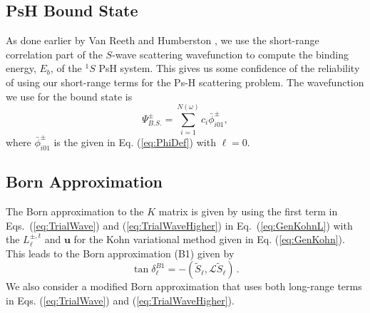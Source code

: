 \documentclass[preprint,showpacs,showkeys,preprintnumbers,amsmath,amssymb,longbibliography,pra,aps]{revtex4-1}
\begin{document}
\subsection{PsH Bound State}
As done earlier by Van Reeth and Humberston \cite{VanReeth2003,VanReeth2004},
we use the short-range correlation part of the $S$-wave scattering wavefunction
to compute the binding energy, $E_b$, of the $^1S$ PsH system. This gives us
some confidence of the reliability of using our short-range terms for the Ps-H 
scattering problem. The wavefunction we use for the bound state is
\begin{equation}
\label{eq:BoundWavefn}
\Psi_{B.S.}^\pm = \sum_{i=1}^{N(\omega)} c_i \bar{\phi}_{i01}^\pm,
\end{equation}
where $\bar{\phi}_{i01}^\pm$ is the given in Eq. (\ref{eq:PhiDef}) with
$\ell = 0$.

\subsection{Born Approximation}
The Born approximation to the $K$ matrix \cite{Bransden2003} is given by
using the first term in Eqs.~(\ref{eq:TrialWave}) and
(\ref{eq:TrialWaveHigher}) in Eq.~(\ref{eq:GenKohnL}) with the $L^{\pm,t}_\ell$
and $\textbf{u}$ for the Kohn variational method given in Eq. (\ref{eq:GenKohn}).
This leads to the Born approximation (B1) given by
\begin{equation}
\label{eq:Born}
\tan\delta_\ell^{B1} = -(\widetilde{S}_\ell,\mathcal{L}\widetilde{S}_\ell )\,.
\end{equation}
We also consider a modified Born approximation that uses both long-range terms
in Eqs. (\ref{eq:TrialWave}) and (\ref{eq:TrialWaveHigher}).
\end{document}

